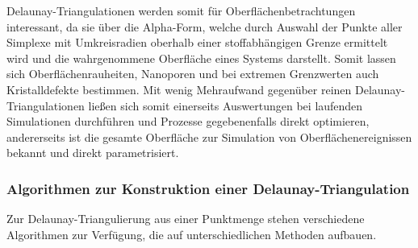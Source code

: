 Delaunay-Triangulationen werden somit für Oberflächenbetrachtungen interessant, da sie über die Alpha-Form, welche durch Auswahl der Punkte aller Simplexe mit Umkreisradien oberhalb einer stoffabhängigen Grenze ermittelt wird und die wahrgenommene Oberfläche eines Systems darstellt.
Somit lassen sich Oberflächenrauheiten, Nanoporen und bei extremen Grenzwerten auch Kristalldefekte bestimmen.
Mit wenig Mehraufwand gegenüber reinen Delaunay-Triangulationen ließen sich somit einerseits Auswertungen bei laufenden Simulationen durchführen und Prozesse gegebenenfalls direkt optimieren, andererseits ist die gesamte Oberfläche zur Simulation von Oberflächenereignissen bekannt und direkt parametrisiert.

\subsubsection{Algorithmen zur Konstruktion einer Delaunay-Triangulation}

Zur Delaunay-Triangulierung aus einer Punktmenge stehen verschiedene Algorithmen zur Verfügung, die auf unterschiedlichen Methoden aufbauen.

